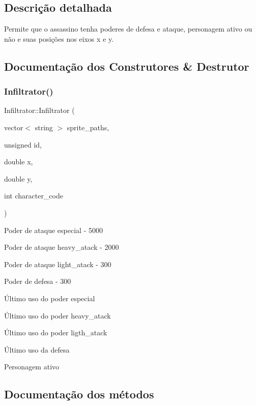 \subsection{Descrição detalhada}
Permite que o assassino tenha poderes de defesa e ataque, personagem ativo ou não e suas posições nos eixos x e y. 

\subsection{Documentação dos Construtores \& Destrutor}
\mbox{\label{classInfiltrator_a1eb1e0a0acf4451da046fa0e8381a1a3}} 
\subsubsection{\texorpdfstring{Infiltrator()}{Infiltrator()}}
{\footnotesize\ttfamily Infiltrator\+::\+Infiltrator (\begin{DoxyParamCaption}\item[{vector$<$ string $>$}]{sprite\+\_\+paths,  }\item[{unsigned}]{id,  }\item[{double}]{x,  }\item[{double}]{y,  }\item[{int}]{character\+\_\+code }\end{DoxyParamCaption})}

Poder de ataque especial -\/ 5000

Poder de ataque heavy\+\_\+atack -\/ 2000

Poder de ataque light\+\_\+atack -\/ 300

Poder de defesa -\/ 300

Último uso do poder especial

Último uso do poder heavy\+\_\+atack

Último uso do poder ligth\+\_\+atack

Último uso da defesa

Personagem ativo 

\subsection{Documentação dos métodos}
\mbox{\label{classInfiltrator_ae423f60190c1df91dcccb7e313845171}} 
